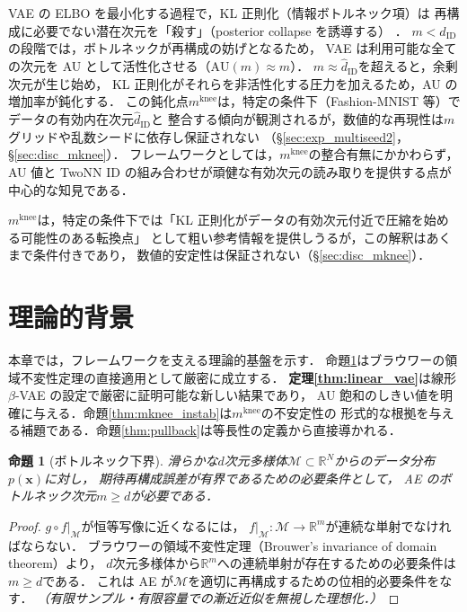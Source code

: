 \documentclass[11pt,a4paper]{jsarticle}
\newtheorem{proposition}{命題}
\newcommand{\R}{\mathbb{R}}
\newcommand{\mknee}{m^{\mathrm{knee}}}
\begin{document}
VAE の ELBO を最小化する過程で，KL 正則化（情報ボトルネック項）は
再構成に必要でない潜在次元を「殺す」（posterior collapse を誘導する）
\cite{lucas2019elbo,higgins2017betavae}．
$m < \hat{d}_\mathrm{ID}$の段階では，ボトルネックが再構成の妨げとなるため，
VAE は利用可能な全ての次元を AU として活性化させる（$\mathrm{AU}(m) \approx m$）．
$m \approx \hat{d}_\mathrm{ID}$を超えると，余剰次元が生じ始め，
KL 正則化がそれらを非活性化する圧力を加えるため，AU の増加率が鈍化する．
この鈍化点$\mknee$は，特定の条件下（Fashion-MNIST 等）でデータの有効内在次元$\hat{d}_\mathrm{ID}$と
整合する傾向が観測されるが，数値的な再現性は$m$グリッドや乱数シードに依存し保証されない
（§\ref{sec:exp_multiseed2}，§\ref{sec:disc_mknee}）．
フレームワークとしては，$\mknee$の整合有無にかかわらず，
AU 値と TwoNN ID の組み合わせが頑健な有効次元の読み取りを提供する点が中心的な知見である．

$\mknee$は，特定の条件下では「KL 正則化がデータの有効次元付近で圧縮を始める可能性のある転換点」
として粗い参考情報を提供しうるが，この解釈はあくまで条件付きであり，
数値的安定性は保証されない（§\ref{sec:disc_mknee}）．

\section{理論的背景}\label{sec:theory}

本章では，フレームワークを支える理論的基盤を示す．
命題\ref{thm:lower_bound}はブラウワーの領域不変性定理の直接適用として厳密に成立する．
\textbf{定理\ref{thm:linear_vae}}は線形$\beta$-VAE の設定で厳密に証明可能な新しい結果であり，
AU 飽和のしきい値を明確に与える．命題\ref{thm:mknee_instab}は$\mknee$の不安定性の
形式的な根拠を与える補題である．命題\ref{thm:pullback}は等長性の定義から直接導かれる．

\begin{proposition}[ボトルネック下界]\label{thm:lower_bound}
滑らかな$d$次元多様体$\mathcal{M} \subset \R^N$からのデータ分布$p(\boldsymbol{x})$に対し，
期待再構成誤差が有界であるための必要条件として，
AE のボトルネック次元$m \geq d$が必要である．
\end{proposition}

\begin{proof}
$g \circ f|_\mathcal{M}$が恒等写像に近くなるには，
$f|_\mathcal{M}: \mathcal{M} \to \R^m$が連続な単射でなければならない．
ブラウワーの領域不変性定理（Brouwer's invariance of domain theorem）\cite{hatcher2002algebraic}より，
$d$次元多様体から$\R^m$への連続単射が存在するための必要条件は$m \geq d$である．
これは AE が$\mathcal{M}$を適切に再構成するための位相的必要条件をなす．
\textit{（有限サンプル・有限容量での漸近近似を無視した理想化．）}
\end{proof}
\end{document}
